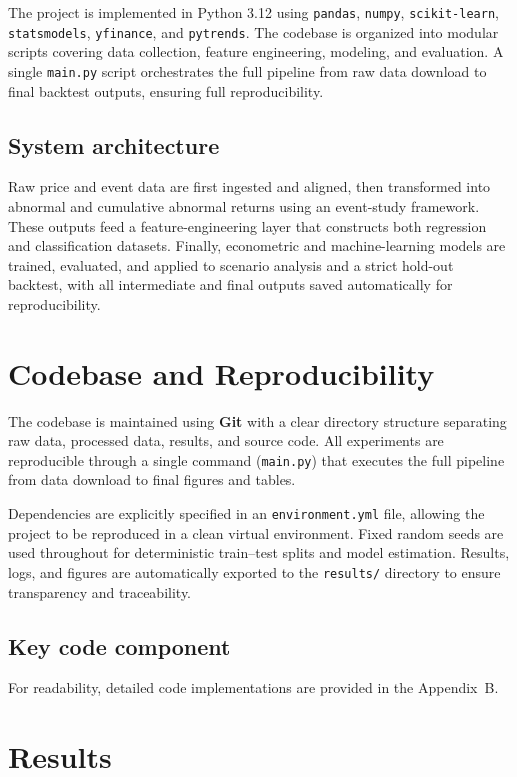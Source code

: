 \documentclass[11pt,a4paper]{article}
\begin{document}
The project is implemented in Python 3.12 using \texttt{pandas}, \texttt{numpy}, \texttt{scikit-learn}, \texttt{statsmodels}, \texttt{yfinance}, and \texttt{pytrends}. The codebase is organized into modular scripts covering data collection, feature engineering, modeling, and evaluation. A single \texttt{main.py} script orchestrates the full pipeline from raw data download to final backtest outputs, ensuring full reproducibility.

\subsection{System architecture}
 Raw price and event data are first ingested and aligned, then transformed into abnormal and cumulative abnormal returns using an event-study framework. These outputs feed a feature-engineering layer that constructs both regression and classification datasets. Finally, econometric and machine-learning models are trained, evaluated, and applied to scenario analysis and a strict hold-out backtest, with all intermediate and final outputs saved automatically for reproducibility.

\section{Codebase and Reproducibility}

The codebase is maintained using \textbf{Git} with a clear directory structure separating raw data, processed data, results, and source code. All experiments are reproducible through a single command (\texttt{main.py}) that executes the full pipeline from data download to final figures and tables.

Dependencies are explicitly specified in an \texttt{environment.yml} file, allowing the project to be reproduced in a clean virtual environment. Fixed random seeds are used throughout for deterministic train–test splits and model estimation. Results, logs, and figures are automatically exported to the \texttt{results/} directory to ensure transparency and traceability.

\subsection{Key code component}
For readability, detailed code implementations are provided in the Appendix~B.

\section{Results}
\label{sec:results}
\end{document}
